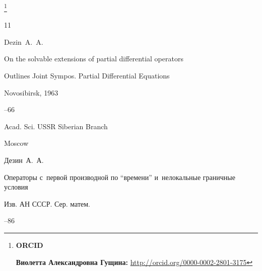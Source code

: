 \thanks{{\bf ORCID}



{\bf Виолетта Александровна Гущина:} \url{http://orcid.org/0000-0002-2801-3175}



}



\RusRef



\begin{thebibliography}{11}




\by Dezin~A.~A.

\paper On the solvable extensions of partial differential operators


\inbook Outlines Joint Sympos. Partial Differential Equations 

\procinfo Novosibirsk, 1963

–66 

\publ Acad. Sci. USSR Siberian Branch

\publaddr Moscow





\by Дезин~А.~А.

\paper Операторы с~первой производной по ``времени'' и~нелокальные граничные условия

\jour Изв. АН СССР. Сер. матем.




--86














\end{thebibliography}
